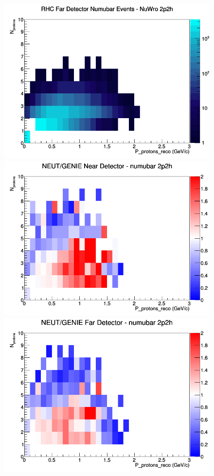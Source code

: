 \begin{figure}[h]
\endminipage
{}
\includegraphics[width=\linewidth]{eff_N_P/LAr/protons/2p2h_RHC_FD_numubar_N_P_NuWro.png}
\endminipage
\newline
{}
\includegraphics[width=\linewidth]{eff_N_P/LAr/protons/ratios/2p2h_NEUT_GENIE_numubar_near_N_P.png}
\endminipage
{}
\includegraphics[width=\linewidth]{eff_N_P/LAr/protons/ratios/2p2h_NEUT_GENIE_numubar_far_N_P.png}

\end{figure}
